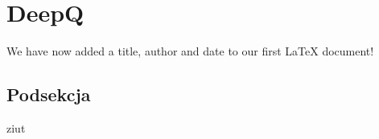 \section{DeepQ}
\label{sec:deepq}
We have now added a title, author and date to our first \LaTeX{} document!
\subsection{Podsekcja}
ziut